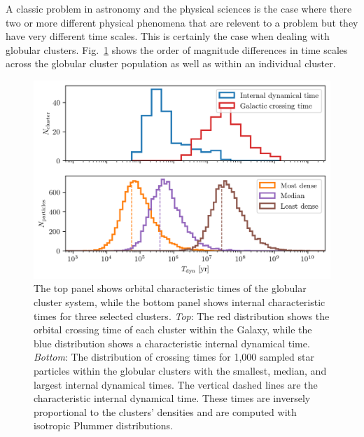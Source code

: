         A classic problem in astronomy and the physical sciences is the case where there two or more different physical phenomena that are relevent to a problem but they have very different time scales. This is certainly the case when dealing with globular clusters. Fig.~\ref{fig:GCsystemCharacteristicTimes} shows the order of magnitude differences in time scales across the globular cluster population as well as within an individual cluster.
        \begin{figure}
            \centering
            \includegraphics[width=\linewidth]{images/GCsystemCharacteristicTimes.png}
            \caption{The top panel shows orbital characteristic times of the globular cluster system, while the bottom panel shows internal characteristic times for three selected clusters. \textit{Top}: The red distribution shows the orbital crossing time of each cluster within the Galaxy, while the blue distribution shows a characteristic internal dynamical time. \textit{Bottom}: The distribution of crossing times for 1,000 sampled star particles within the globular clusters with the smallest, median, and largest internal dynamical times. The vertical dashed lines are the characteristic internal dynamical time. These times are inversely proportional to the clusters' densities and are computed with isotropic Plummer distributions.}
            \label{fig:GCsystemCharacteristicTimes}
        \end{figure}

